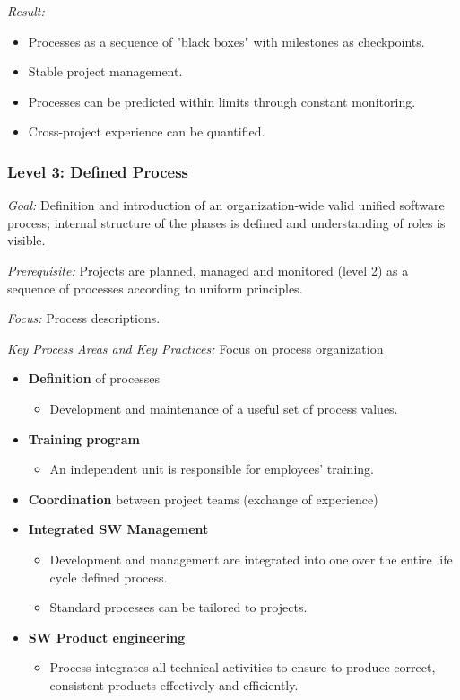 \documentclass[11pt,a4paper]{article}
\begin{document}
\emph{Result:}
\begin {itemize} 
\item Processes as a sequence of "black boxes" with milestones as checkpoints.
\item Stable project management.
\item Processes can be predicted within limits through constant monitoring.
\item Cross-project experience can be quantified.
\end {itemize}

\subsubsection*{Level 3: Defined Process}

\emph{Goal:} Definition and introduction of an organization-wide valid unified
software process; internal structure of the phases is defined and
understanding of roles is visible.

\emph {Prerequisite:} Projects are planned, managed and monitored (level 2) as
a sequence of processes according to uniform principles.

\emph {Focus:} Process descriptions.

\emph {Key Process Areas and Key Practices:} Focus on process organization
\begin {itemize} 
\item \textbf {Definition} of processes
  \begin {itemize} 
  \item Development and maintenance of a useful set of process values.
  \end {itemize}
\item \textbf {Training program}
  \begin {itemize} 
  \item An independent unit is responsible for employees' training.
  \end {itemize}
\item \textbf {Coordination} between project teams (exchange of experience)
\item \textbf {Integrated SW Management}
  \begin {itemize} 
  \item Development and management are integrated into one over the entire
    life cycle defined process.
  \item Standard processes can be tailored to projects.
  \end {itemize}
\item \textbf {SW Product engineering}
  \begin {itemize} 
  \item Process integrates all technical activities to ensure to produce
    correct, consistent products effectively and efficiently.
  \end {itemize}
\end {itemize}
\end{document}
